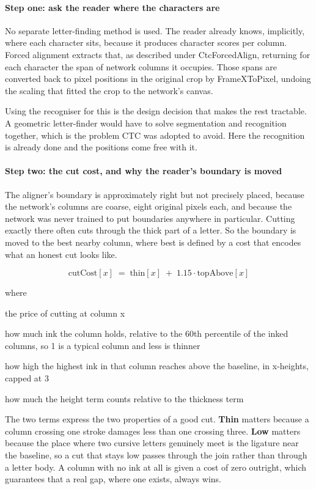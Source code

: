 \paragraph{Step one: ask the reader where the characters are}
No separate letter-finding method is used. The reader already knows, implicitly, where each character sits, because it produces character scores per column. Forced alignment extracts that, as described under CtcForcedAlign, returning for each character the span of network columns it occupies. Those spans are converted back to pixel positions in the original crop by FrameXToPixel, undoing the scaling that fitted the crop to the network's canvas.

Using the recogniser for this is the design decision that makes the rest tractable. A geometric letter-finder would have to solve segmentation and recognition together, which is the problem CTC was adopted to avoid. Here the recognition is already done and the positions come free with it.


\paragraph{Step two: the cut cost, and why the reader's boundary is moved}
The aligner's boundary is approximately right but not precisely placed, because the network's columns are coarse, eight original pixels each, and because the network was never trained to put boundaries anywhere in particular. Cutting exactly there often cuts through the thick part of a letter. So the boundary is moved to the best nearby column, where best is defined by a cost that encodes what an honest cut looks like.


\begin{equation}
\mathrm{cutCost}[x] \;=\; \mathrm{thin}[x] \;+\; 1.15 \cdot \mathrm{topAbove}[x]
\end{equation}

\noindent where
\begin{description}[leftmargin=2.4em,style=nextline,font=\normalfont\ttfamily]\setlength\itemsep{1pt}
  \item[{$\mathrm{cutCost}[x]$}] \normalfont the price of cutting at column x
  \item[{$\mathrm{thin}[x]$}] \normalfont how much ink the column holds, relative to the 60th percentile of the inked columns, so 1 is a typical column and less is thinner
  \item[{$\mathrm{topAbove}[x]$}] \normalfont how high the highest ink in that column reaches above the baseline, in x-heights, capped at 3
  \item[{$1.15$}] \normalfont how much the height term counts relative to the thickness term
\end{description}
The two terms express the two properties of a good cut. \textbf{Thin} matters because a column crossing one stroke damages less than one crossing three. \textbf{Low} matters because the place where two cursive letters genuinely meet is the ligature near the baseline, so a cut that stays low passes through the join rather than through a letter body. A column with no ink at all is given a cost of zero outright, which guarantees that a real gap, where one exists, always wins.

